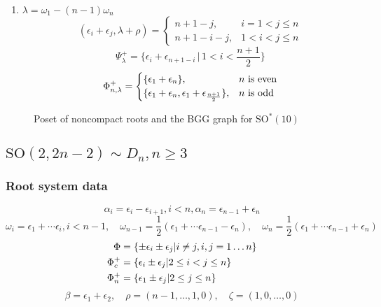 \begin{enumerate}
 \item $\lambda = \omega_1 -(n-1)\omega_n $\\
 \[
  (\epsilon_i + \epsilon_j,\lambda+\rho) = \begin{cases}
                                            n+1-j, & i=1<j\leq n\\
                                            n+1-i-j, & 1<i<j\leq n
                                           \end{cases}
 \]
 \[
   \Psi^+_\lambda = \Big\{\epsilon_i + \epsilon_{n+1-i} \,\big|\, 1 < i < \frac{n+1}{2} \Big\}
 \]
 \[
   \Phi^+_{n,\lambda} = \begin{cases}
				\{\epsilon_1 + \epsilon_n \}, & n \text{ is even} \\
				\{\epsilon_1 + \epsilon_n, \epsilon_1 + \epsilon_{\frac{n+1}{2}} \}, & n \text{ is odd}
			  \end{cases}
  \]
\end{enumerate}

\begin{figure}[H]
  \centering
   
	 
  \caption{Poset of noncompact roots and the BGG graph for $\mathrm{SO}^*(10)$}
\end{figure} 

\clearpage

\subsection[SO(2,2n-2)]{$\mathrm{SO}(2,2n-2) \sim D_n, n\geq 3$}

\subsubsection{Root system data}

\[\alpha_i = \epsilon_i - \epsilon_{i+1}, i<n, \alpha_n = \epsilon_{n-1} + \epsilon_n\]
\[\omega_i = \epsilon_1+\cdots \epsilon_i, i < n-1, \quad \omega_{n-1} = \frac{1}{2}(\epsilon_1 + \cdots \epsilon_{n-1}-\epsilon_n), \quad \omega_{n} = \frac{1}{2}(\epsilon_1 + \cdots \epsilon_{n-1}+\epsilon_n)\]
\begin{align*}
 \Phi &= \{ \pm \epsilon_i \pm \epsilon_j | i\neq j, i,j = 1\ldots n \} \\
 \Phi_c^+ &= \{ \epsilon_i\pm \epsilon_j | 2\leq i < j \leq  n\}\\
 \Phi_n^+ &= \{ \epsilon_1 \pm \epsilon_j | 2 \leq  j \leq n \}
 \end{align*}
\[\beta = \epsilon_1+\epsilon_2,\quad \rho = (n-1,\ldots ,1,0),\quad \zeta = (1,0,\ldots,0)\]

